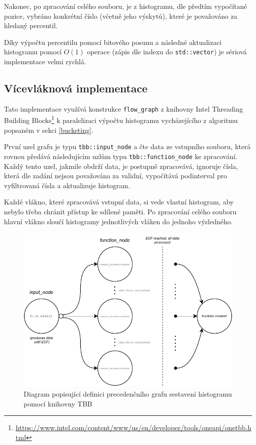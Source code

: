 \documentclass[12pt, a4paper]{article}
\begin{document}
Nakonec, po zpracování celého souboru, je z histogramu, dle předtím vypočítané pozice, vybráno konkrétní číslo (včetně jeho výskytů), které je považováno za hledaný percentil.

Díky výpočtu percentilu pomocí bitového posunu a následné aktualizaci histogramu pomocí $O(1)$ operace (zápis dle indexu do \texttt{std::vector}) je sériová implementace velmi rychlá.

\subsection{Vícevláknová implementace}
Tato implementace využívá konstrukce \texttt{flow\_graph} z knihovny Intel Threading Building Blocks\footnote{\url{https://www.intel.com/content/www/us/en/developer/tools/oneapi/onetbb.html}} k paralelizaci výpočtu histogramu vycházejícího z algoritmu popsaném v sekci \ref{bucketing}.

První uzel grafu je typu \texttt{tbb::input\_node} a čte data ze vstupního souboru, která rovnou předává následujícím uzlům typu \texttt{tbb::function\_node} ke zpracování.
Každý tento uzel, jakmile obdrží data, je postupně zpracovává, ignoruje čísla, která dle zadání nejsou považována za validní, vypočítává podinterval pro vyfiltrovaná čísla a aktualizuje histogram. 

Každé vlákno, které zpracovává vstupní data, si vede vlastní histogram, aby nebylo třeba chránit přístup ke sdílené paměti.
Po zpracování celého souboru hlavní vlákno sloučí histogramy jednotlivých vláken do jednoho výsledného.

\begin{figure}[!ht]
    \centering 
    \includegraphics[width=1.0\textwidth]{pdf/create-buckets-tbb.pdf}
    \caption{Diagram popisující definici precedenčního grafu sestavení histogramu pomocí knihovny TBB}
\end{figure}
\end{document}
